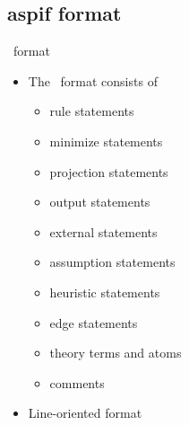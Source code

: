 \subsection{aspif format}
\begin{frame}{\aspif\ format}
  \begin{itemize}
  \item The \aspif\ format consists of
    \begin{itemize}
    \item rule statements
    \item minimize statements
    \item projection statements
    \item output statements
    \item external statements
    \item assumption statements
    \item heuristic statements
    \item edge statements
    \item theory terms and atoms
    \item comments
    \end{itemize}
  \item Line-oriented format
  \end{itemize}
\end{frame}
